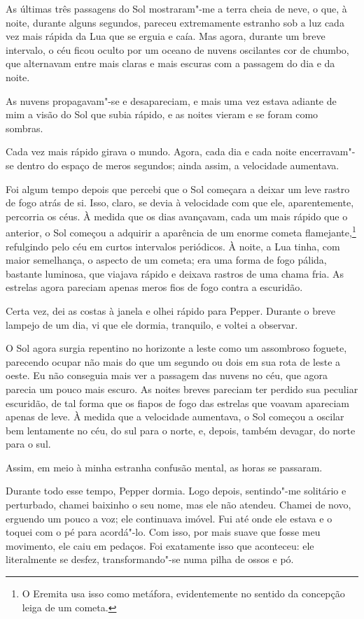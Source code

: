 As últimas três passagens do Sol mostraram"-me a terra cheia de neve, o que, à noite, durante alguns segundos, pareceu
extremamente estranho sob a luz cada vez mais rápida da Lua que se erguia e caía. Mas agora, durante um breve
intervalo, o céu ficou oculto por um oceano de nuvens oscilantes cor de chumbo, que alternavam entre mais claras
e mais escuras com a passagem do dia e da noite.

As nuvens propagavam"-se e desapareciam, e mais uma vez estava adiante de mim a visão do Sol que subia rápido, e as
noites vieram e se foram como sombras.

Cada vez mais rápido girava o mundo. Agora, cada dia e cada noite encerravam"-se dentro do espaço de meros segundos;
ainda assim, a velocidade aumentava.

Foi algum tempo depois que percebi que o Sol começara a deixar um leve rastro de fogo atrás de si. Isso, claro,
se devia à velocidade com que ele, aparentemente, percorria os céus. À medida que os dias avançavam, cada um mais
rápido que o anterior, o Sol começou a adquirir a aparência de um enorme cometa flamejante,\footnote{ O Eremita usa isso
como metáfora, evidentemente no sentido da concepção leiga de um cometa.} refulgindo pelo céu em
curtos intervalos periódicos. À noite, a Lua tinha, com maior semelhança, o aspecto de um cometa; era uma forma de fogo
pálida, bastante luminosa, que viajava rápido e deixava rastros de uma chama fria. As estrelas agora pareciam apenas
meros fios de fogo contra a escuridão.

Certa vez, dei as costas à janela e olhei rápido para Pepper. Durante o breve lampejo de um dia, vi que ele dormia,
tranquilo, e voltei a observar.

O Sol agora surgia repentino no horizonte a leste como um assombroso foguete, parecendo ocupar não mais do que um
segundo ou dois em sua rota de leste a oeste. Eu não conseguia mais ver a passagem das nuvens no céu, que agora parecia
um pouco mais escuro. As noites breves pareciam ter perdido sua peculiar escuridão, de tal forma que os fiapos de fogo
das estrelas que voavam apareciam apenas de leve. À medida que a velocidade aumentava, o Sol começou a oscilar bem
lentamente no céu, do sul para o norte, e, depois, também devagar, do norte para o sul.

Assim, em meio à minha estranha confusão mental, as horas se passaram.

Durante todo esse tempo, Pepper dormia. Logo depois, sentindo"-me solitário e perturbado, chamei baixinho o seu nome,
mas ele não atendeu. Chamei de novo, erguendo um pouco a voz; ele continuava imóvel. Fui até onde ele estava e o
toquei com o pé para acordá"-lo. Com isso, por mais suave que fosse meu movimento, ele caiu em pedaços. Foi exatamente
isso que aconteceu: ele literalmente se desfez, transformando"-se numa pilha de ossos e pó.

